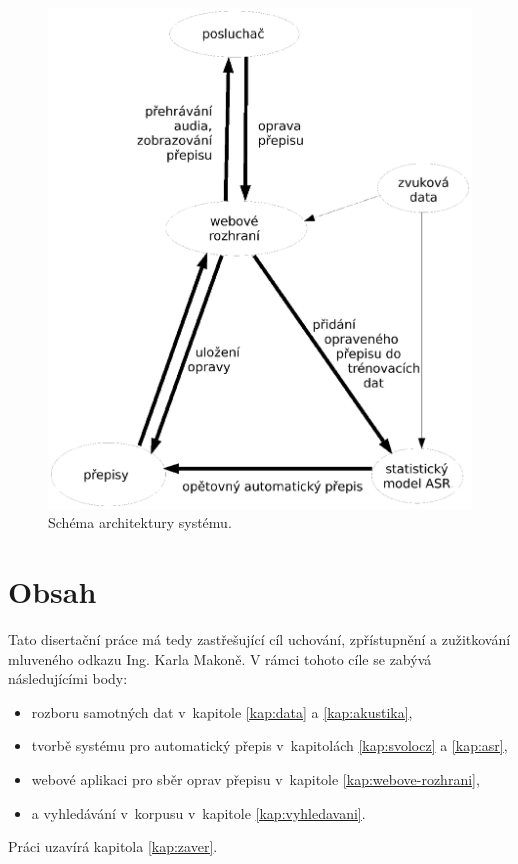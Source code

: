 \begin{figure}[htpb]
\includegraphics[scale=1.0]{rc/arch.eps}
\caption{Schéma architektury systému.}
\label{fig:arch}
\end{figure}

\section{Obsah}

Tato disertační práce má tedy zastřešující cíl uchování, zpřístupnění a
zužitkování mluveného odkazu Ing. Karla Makoně. V rámci tohoto cíle se zabývá
následujícími body:

\begin{itemize}
\item{rozboru samotných dat v~kapitole \ref{kap:data} a \ref{kap:akustika},}
\item{tvorbě systému pro automatický přepis v~kapitolách \ref{kap:svolocz} a \ref{kap:asr},}
\item{webové aplikaci pro sběr oprav přepisu v~kapitole \ref{kap:webove-rozhrani},}
\item{a vyhledávání v~korpusu v~kapitole \ref{kap:vyhledavani}.}
\end{itemize}

Práci uzavírá kapitola \ref{kap:zaver}.
